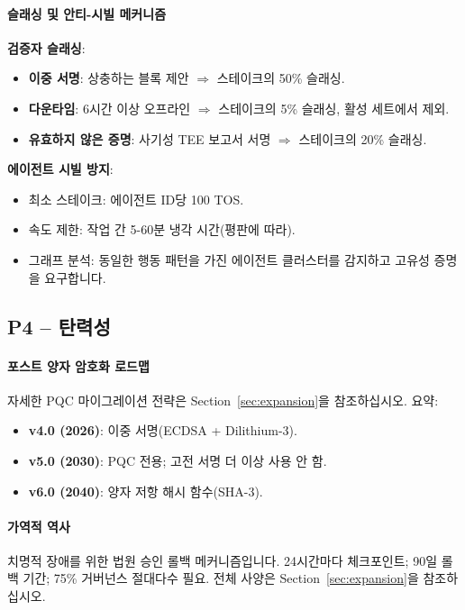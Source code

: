 \documentclass[11pt]{article}
\begin{document}
\paragraph{슬래싱 및 안티-시빌 메커니즘}
\textbf{검증자 슬래싱}:
\begin{itemize}[noitemsep]
  \item \textbf{이중 서명}: 상충하는 블록 제안 $\Rightarrow$ 스테이크의 50\% 슬래싱.
  \item \textbf{다운타임}: 6시간 이상 오프라인 $\Rightarrow$ 스테이크의 5\% 슬래싱, 활성 세트에서 제외.
  \item \textbf{유효하지 않은 증명}: 사기성 TEE 보고서 서명 $\Rightarrow$ 스테이크의 20\% 슬래싱.
\end{itemize}

\textbf{에이전트 시빌 방지}:
\begin{itemize}[noitemsep]
  \item 최소 스테이크: 에이전트 ID당 100 TOS.
  \item 속도 제한: 작업 간 5-60분 냉각 시간(평판에 따라).
  \item 그래프 분석: 동일한 행동 패턴을 가진 에이전트 클러스터를 감지하고 고유성 증명을 요구합니다.
\end{itemize}

\subsection{P4 -- 탄력성}
\label{sec:pillar-resilience}

\paragraph{포스트 양자 암호화 로드맵}
자세한 PQC 마이그레이션 전략은 Section~\ref{sec:expansion}을 참조하십시오. 요약:
\begin{itemize}[noitemsep]
  \item \textbf{v4.0 (2026)}: 이중 서명(ECDSA + Dilithium-3).
  \item \textbf{v5.0 (2030)}: PQC 전용; 고전 서명 더 이상 사용 안 함.
  \item \textbf{v6.0 (2040)}: 양자 저항 해시 함수(SHA-3).
\end{itemize}

\paragraph{가역적 역사}
치명적 장애를 위한 법원 승인 롤백 메커니즘입니다. 24시간마다 체크포인트; 90일 롤백 기간; 75\% 거버넌스 절대다수 필요. 전체 사양은 Section~\ref{sec:expansion}을 참조하십시오.
\end{document}
